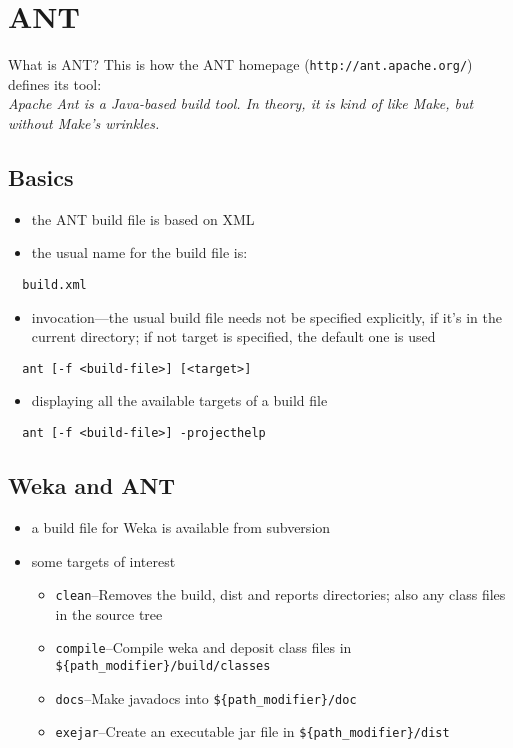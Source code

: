 
\section{ANT}

What is ANT? This is how the ANT homepage (\verb=http://ant.apache.org/=) defines its tool:\\

\noindent \emph{Apache Ant is a Java-based build tool. In theory, it is kind of like Make, but without Make's wrinkles.}

\subsection{Basics}

\begin{itemize}
\item the ANT build file is based on XML
\item the usual name for the build file is:
\end{itemize}

\verb=  build.xml=

\begin{itemize}
\item invocation---the usual build file needs not be specified explicitly, if it's in the current directory; if not target is specified, the default one is used
\end{itemize}

\verb=  ant [-f <build-file>] [<target>]=

\begin{itemize}
\item displaying all the available targets of a build file
\end{itemize}

\verb=  ant [-f <build-file>] -projecthelp=

\subsection{Weka and ANT}

\begin{itemize}
\item a build file for Weka is available from subversion
\item some targets of interest
  \begin{itemize}
  \item \verb=clean=--Removes the build, dist and reports directories; also any class files in the source tree
  \item \verb=compile=--Compile weka and deposit class files in\\ \verb=${path_modifier}/build/classes=
  \item \verb=docs=--Make javadocs into \verb=${path_modifier}/doc=
  \item \verb=exejar=--Create an executable jar file in \verb=${path_modifier}/dist=
  \end{itemize}
\end{itemize}

